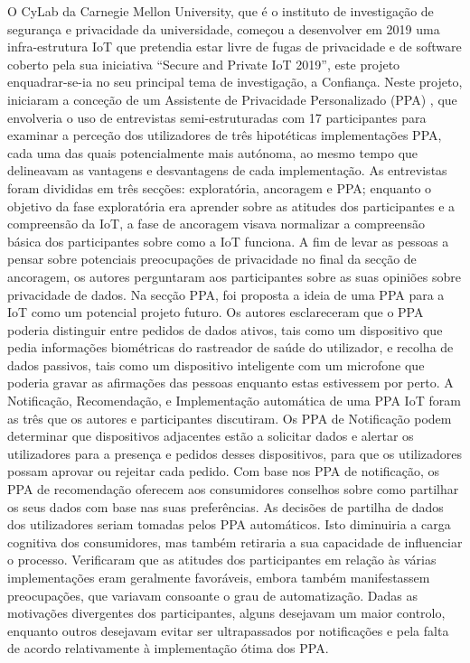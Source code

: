 \documentclass[conference]{IEEEtran}
\begin{document}

O CyLab da Carnegie Mellon University, que é o instituto de investigação de
segurança e privacidade da universidade, começou a desenvolver em 2019 uma
infra-estrutura IoT que pretendia estar livre de fugas de privacidade e de
software coberto pela sua iniciativa ``Secure and Private IoT 2019'', este
projeto enquadrar-se-ia no seu principal tema de investigação, a Confiança.
Neste projeto, iniciaram a conceção de um Assistente de Privacidade Personalizado
(PPA) \cite{ColnagoInforming}, que envolveria o uso de entrevistas semi-estruturadas
com 17 participantes para examinar a perceção dos utilizadores de três hipotéticas
implementações PPA, cada uma das quais potencialmente mais autónoma, ao mesmo
tempo que delineavam as vantagens e desvantagens de cada implementação. As
entrevistas foram divididas em três secções: exploratória, ancoragem e PPA;
enquanto o objetivo da fase exploratória era aprender sobre as atitudes dos
participantes e a compreensão da IoT, a fase de ancoragem visava normalizar
a compreensão básica dos participantes sobre como a IoT funciona. A fim de
levar as pessoas a pensar sobre potenciais preocupações de privacidade no final
da secção de ancoragem, os autores perguntaram aos participantes sobre as suas
opiniões sobre privacidade de dados. Na secção PPA, foi proposta a ideia de
uma PPA para a IoT como um potencial projeto futuro. Os autores esclareceram
que o PPA poderia distinguir entre pedidos de dados ativos, tais como um dispositivo
que pedia informações biométricas do rastreador de saúde do utilizador, e recolha
de dados passivos, tais como um dispositivo inteligente com um microfone que
poderia gravar as afirmações das pessoas enquanto estas estivessem por perto.
A Notificação, Recomendação, e Implementação automática de uma PPA IoT foram
as três que os autores e participantes discutiram. Os PPA de Notificação podem
determinar que dispositivos adjacentes estão a solicitar dados e alertar os
utilizadores para a presença e pedidos desses dispositivos, para que os utilizadores
possam aprovar ou rejeitar cada pedido. Com base nos PPA de notificação, os
PPA de recomendação oferecem aos consumidores conselhos sobre como partilhar
os seus dados com base nas suas preferências. As decisões de partilha de dados
dos utilizadores seriam tomadas pelos PPA automáticos. Isto diminuiria a carga
cognitiva dos consumidores, mas também retiraria a sua capacidade de influenciar
o processo. Verificaram que as atitudes dos participantes em relação às várias
implementações eram geralmente favoráveis, embora também manifestassem preocupações,
que variavam consoante o grau de automatização. Dadas as motivações divergentes
dos participantes, alguns desejavam um maior controlo, enquanto outros desejavam
evitar ser ultrapassados por notificações e pela falta de acordo relativamente
à implementação ótima dos PPA.
\end{document}
